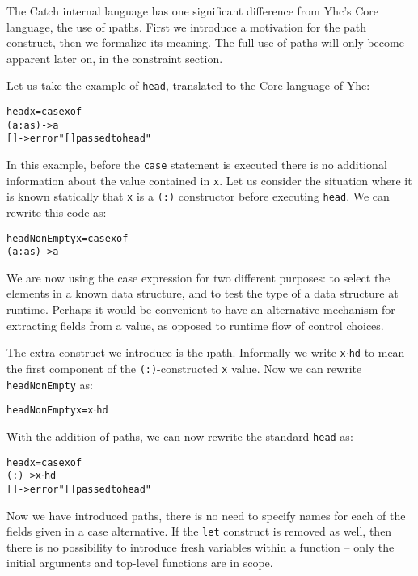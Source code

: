\documentclass[preprint]{sigplanconf}
\newcommand{\T}[1]{\texttt{#1}}
\newenvironment{code}{\begin{alltt}\small}{\end{alltt}}
\newcommand{\D}{\ensuremath{\cdot}} %
\begin{document}
The Catch internal language has one significant difference from Yhc's Core
language, the use of \i{paths}. First we introduce a motivation for the path
construct, then we formalize its meaning. The full use of paths will only
become apparent later on, in the constraint section.

Let us take the example of \T{head}, translated to the Core language of Yhc:

\begin{code}
 head x = case x of
              (a:as) -> a
              [] -> error "[] passed to head"
\end{code}

In this example, before the \T{case} statement is executed there is no
additional information about the value contained in \T{x}. Let us consider the
situation where it is known statically that \T{x} is a \T{(:)} constructor
before executing \T{head}. We can rewrite this code as:

\begin{code}
 headNonEmpty x = case x of
                      (a:as) -> a
\end{code}

We are now using the case expression for two different purposes: to select the
elements in a known data structure, and to test the type of a data structure at
runtime. Perhaps it would be convenient to have an alternative mechanism for
extracting fields from a value, as opposed to runtime flow of control choices.

The extra construct we introduce is the \i{path}. Informally we write
\T{x\D{}hd} to mean the first component of the \T{(:)}-constructed \T{x} value.
Now we can rewrite \T{headNonEmpty} as:

\begin{code}
 headNonEmpty x = x\(\D\)hd
\end{code}

With the addition of paths, we can now rewrite the standard \T{head} as:

\begin{code}
 head x = case x of
            (:) -> x\(\D\)hd
            [] -> error "[] passed to head"
\end{code}

Now we have introduced paths, there is no need to specify names for each of the
fields given in a case alternative. If the \T{let} construct is removed as
well, then there is no possibility to introduce fresh variables within a
function -- only the initial arguments and top-level functions are in scope.
\end{document}
